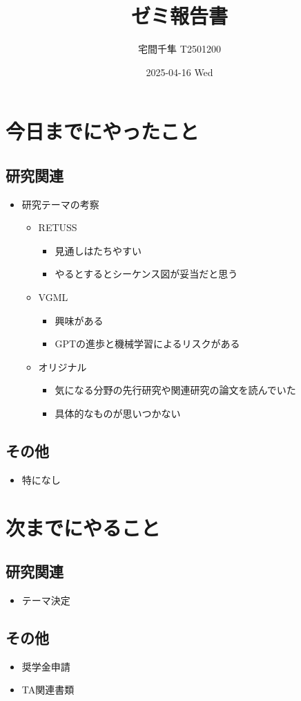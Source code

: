 \documentclass[uplatex, onecolumn, 10pt]{jsarticle}
\begin{document}
\title{\vspace{-40mm}\bf{\LARGE{ゼミ報告書}}}
\author{\vspace{-40mm}宅間千隼 T2501200}
\date{2025-04-16 Wed}
\maketitle


\section{今日までにやったこと}

\subsection*{研究関連}
\begin{itemize}
  \item 研究テーマの考察
  \begin{itemize}
    \item RETUSS
    \begin{itemize}
      \item 見通しはたちやすい
      \item やるとするとシーケンス図が妥当だと思う
    \end{itemize}
    \item VGML
    \begin{itemize}
      \item 興味がある
      \item GPTの進歩と機械学習によるリスクがある
    \end{itemize}
    \item オリジナル
    \begin{itemize}
      \item 気になる分野の先行研究や関連研究の論文を読んでいた
      \item 具体的なものが思いつかない
    \end{itemize}
  \end{itemize}
\end{itemize}

\subsection*{その他}
\begin{itemize}
  \item 特になし
\end{itemize}

\section{次までにやること}

\subsection*{研究関連}
\begin{itemize}
  \item テーマ決定
\end{itemize}

\subsection*{その他}
\begin{itemize}
  \item 奨学金申請
  \item TA関連書類
\end{itemize}
\end{document}
